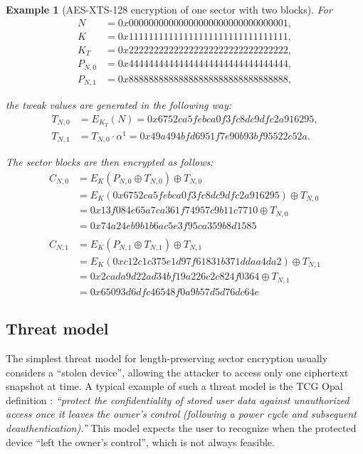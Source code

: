 \documentclass[a4paper]{article}
\newtheorem{example}{Example}
\begin{document}
\begin{example}[AES-XTS-128 encryption of one sector with two blocks]\hfill\break
\indent For
\begin{align*}
N       & = 0x00000000000000000000000000000001, \\
K       & = 0x11111111111111111111111111111111, \\
K_T     & = 0x22222222222222222222222222222222, \\
P_{N,0} & = 0x44444444444444444444444444444444, \\
P_{N,1} & = 0x88888888888888888888888888888888,
\end{align*}

the tweak values are generated in the following way:
\begin{align*}
T_{N,0} & = E_{K_T}(N)             = 0x6752ca5febca0f3fc8dc9dfc2a916295, \\
T_{N,1} & = T_{N,0} \cdot \alpha^1 = 0x49a494bfd6951f7e90b93bf95522c52a.
\end{align*}

The sector blocks are then encrypted as follows:
\begin{align*}
C_{N,0} & = E_K(P_{N,0} \oplus T_{N,0}) \oplus T_{N,0} \\
        & = E_K(0x6752ca5febca0f3fc8dc9dfc2a916295) \oplus T_{N,0} \\
        & = 0x13f084e65a7ca361f74957c9b11c7710 \oplus T_{N,0} \\
        & = 0x74a24eb9b1b6ac5e3f95ca359b8d1585 \\
\\
C_{N,1} & = E_K(P_{N,1} \oplus T_{N,1}) \oplus T_{N,1} \\
        & = E_K(0xc12c1c375e1d97f61831b371ddaa4da2) \oplus T_{N,1} \\
        & = 0x2cada9d22ad34bf19a226c2c824f0364 \oplus T_{N,1} \\
        & = 0x65093d6dfc46548f0a9b57d5d76dc64e
\end{align*}

\end{example}

\clearpage
\subsection{Threat model}
The simplest threat model for length-preserving sector encryption usually considers a ``stolen device'', allowing the attacker to access only one ciphertext snapshot at time.
A typical example of such a threat model is the TCG Opal definition \cite{tcgopal}:
\emph{``protect the confidentiality of stored user data against unauthorized access once it leaves the owner's control (following a power cycle and subsequent deauthentication).''}
This model expects the user to recognize when the protected device ``left the owner's control'', which is not always feasible.
\end{document}

